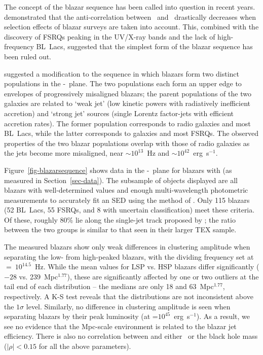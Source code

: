 \documentclass{emulateapj}
\begin{document}
The concept of the blazar sequence has been called into question in recent years. \citet{pad07} demonstrated that the anti-correlation between \lpeak~and \nupeak~drastically decreases when selection effects of blazar surveys are taken into account. This, combined with the discovery of FSRQs peaking in the UV/X-ray bands \citep{pad03,lan08a} and the lack of high-frequency BL~Lacs, suggested that the simplest form of the blazar sequence has been ruled out. 

\citet{mey11} suggested a modification to the sequence in which blazars form two distinct populations in the \nupeak-\lpeak~plane. The two populations each form an upper edge to envelopes of progressively misaligned blazars; the parent populations of the two galaxies are related to `weak jet' (low kinetic powers with radiatively inefficient accretion) and `strong jet' sources (single Lorentz factor-jets with efficient accretion rates). The former population corresponds to \FRI{} radio galaxies and most BL~Lacs, while the latter corresponds to \FRII{} galaxies and most FSRQs. The observed properties of the two blazar populations overlap with those of radio galaxies as the jets become more misaligned, near \nupeak$\sim10^{13}$~Hz and \lpeak$\sim10^{42}$~erg~s$^{-1}$. 

Figure~\ref{fig-blazarsequence} shows data in the \nupeak-\lpeak~plane for blazars with \bgb{} (as measured in Section~\ref{sec-data}). The subsample of objects displayed are all blazars with well-determined \bgb{} values and enough multi-wavelength photometric measurements to accurately fit an SED using the method of \citet{mey11}. Only 115 blazars (52 BL~Lacs, 55 FSRQs, and 8 with uncertain classification) meet these criteria. Of these, roughly 80\% lie along the single-jet track proposed by \citet{mey11}; the ratio between the two groups is similar to that seen in their larger TEX sample. 

The measured blazars show only weak differences in clustering amplitude when separating the low- from high-peaked blazars, with the dividing frequency set at \nupeak~$=~10^{14.5}$~Hz. While the mean \bgb{} values for LSP vs. HSP blazars differ significantly ($-28$ vs. 239~Mpc$^{1.77}$), these are significantly affected by one or two outliers at the tail end of each distribution -- the medians are only 18 and 63~Mpc$^{1.77}$, respectively. A K-S test reveals that the \bgb{} distributions are not inconsistent above the $1\sigma$ level. Similarly, no difference in clustering amplitude is seen when separating blazars by their peak luminosity (at \lpeak=$10^{45}$~erg~s$^{-1}$). As a result, we see no evidence that the Mpc-scale environment is related to the blazar jet efficiency. There is also no correlation between \bgb{} and either \lext~or the black hole mass ($|\rho|<0.15$ for all the above parameters). 
\end{document}
